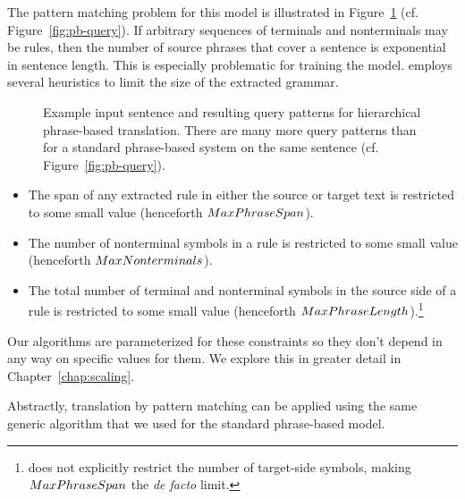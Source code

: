 The pattern matching problem for this model is illustrated in 
Figure~\ref{fig:hiero-query} (cf. Figure~\ref{fig:pb-query}).  
If arbitrary sequences of terminals
and nonterminals may be rules, then the number of source phrases
that cover a sentence is exponential in sentence length.  This is
especially problematic for training the model.  \citet{Chiang:2007:cl}
employs several heuristics to limit the size of the extracted grammar.

\figpreamble
\begin{figure}
	\figfontsize{
	\begin{center}
		
	\end{center}}
	\figpostamble
\caption[Example input sentence and resulting query pattern for hierarchical phrase-based translation.]{Example input sentence and resulting query 
patterns for hierarchical phrase-based translation.  There
are many more query patterns than for a standard phrase-based system
on the same sentence (cf. Figure~\ref{fig:pb-query}).}
\label{fig:hiero-query}
\end{figure}

\begin{itemize}
	\item The span of any extracted rule in either the source or target text is restricted to some small value (henceforth $MaxPhraseSpan$).
	\item The number of nonterminal symbols in a rule is restricted to some small value (henceforth $MaxNonterminals$).
	\item The total number of terminal and nonterminal symbols in the source side of a rule is restricted to some small value (henceforth $MaxPhraseLength$).\footnote{\citet{Chiang:2007:cl} does not explicitly restrict the number of target-side symbols, making $MaxPhraseSpan$ the {\em de facto} limit.}
\end{itemize}

\noindent Our algorithms are parameterized for these constraints
so they don't depend in any way on specific values for them.  We explore
this in greater detail in Chapter~\ref{chap:scaling}.

Abstractly, translation by pattern matching can be applied
using the same generic algorithm that we used for the standard
phrase-based model.

